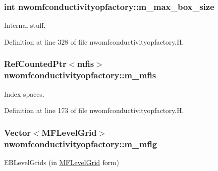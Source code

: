 \subsubsection[{\texorpdfstring{m\+\_\+max\+\_\+box\+\_\+size}{m_max_box_size}}]{\setlength{\rightskip}{0pt plus 5cm}int nwomfconductivityopfactory\+::m\+\_\+max\+\_\+box\+\_\+size\hspace{0.3cm}{\ttfamily [protected]}}\hypertarget{classnwomfconductivityopfactory_ac4757762d73be5308ca61907395b8977}{}\label{classnwomfconductivityopfactory_ac4757762d73be5308ca61907395b8977}


Internal stuff. 



Definition at line 328 of file nwomfconductivityopfactory.\+H.

\subsubsection[{\texorpdfstring{m\+\_\+mfis}{m_mfis}}]{\setlength{\rightskip}{0pt plus 5cm}Ref\+Counted\+Ptr$<${\bf mfis}$>$ nwomfconductivityopfactory\+::m\+\_\+mfis\hspace{0.3cm}{\ttfamily [protected]}}\hypertarget{classnwomfconductivityopfactory_a175cb9eafc8c385f1d4ee9d284cbee38}{}\label{classnwomfconductivityopfactory_a175cb9eafc8c385f1d4ee9d284cbee38}


Index spaces. 



Definition at line 173 of file nwomfconductivityopfactory.\+H.

\subsubsection[{\texorpdfstring{m\+\_\+mflg}{m_mflg}}]{\setlength{\rightskip}{0pt plus 5cm}Vector$<${\bf M\+F\+Level\+Grid}$>$ nwomfconductivityopfactory\+::m\+\_\+mflg\hspace{0.3cm}{\ttfamily [protected]}}\hypertarget{classnwomfconductivityopfactory_aef2ddf9f6090d59149da9cce87cac954}{}\label{classnwomfconductivityopfactory_aef2ddf9f6090d59149da9cce87cac954}


E\+B\+Level\+Grids (in \hyperlink{classMFLevelGrid}{M\+F\+Level\+Grid} form) 



